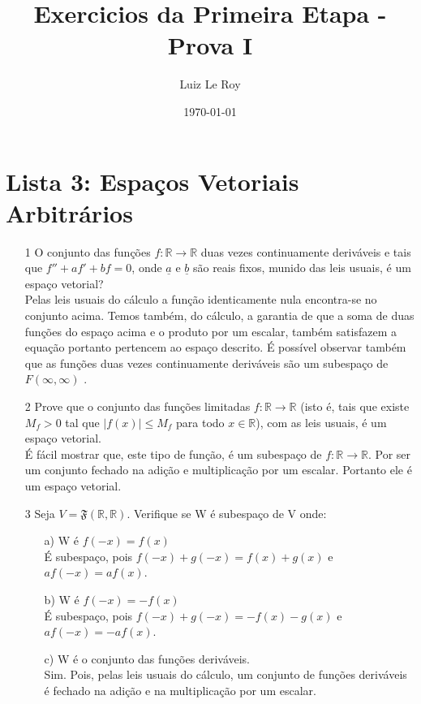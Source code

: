 \documentclass[a4paper]{article}
\title{Exercicios da Primeira Etapa - Prova I}
\date{\mydate\today}
\author{Luiz Le Roy}
\begin{document}
  \maketitle

\section*{Lista 3: Espaços Vetoriais Arbitrários}
\begin{itemize}
\item[1] O conjunto das funções $f:\mathbb{R}\longrightarrow \mathbb{R}$ duas vezes continuamente deriváveis e tais que $f''+af'+bf=0$, onde $\underline{a}$ e $\underline{b}$ são reais fixos, munido das leis usuais, é um espaço vetorial?
\\\textcolor[rgb]{0,0,1}{Pelas leis usuais do cálculo a função identicamente nula encontra-se no conjunto acima. Temos também, do cálculo, a garantia de que a soma de duas funções do espaço acima e o produto por um escalar, também satisfazem a equação portanto pertencem ao espaço descrito. É possível observar também que as funções duas vezes continuamente deriváveis são um subespaço de $F(\infty,\infty)$ .%
}
\item[2] Prove que o conjunto das funções limitadas $f:\mathbb{R}\longrightarrow \mathbb{R}$ (isto é, tais que existe $M_f>0$ tal que $|f(x)|\leq M_f$ para todo $x\in \mathbb{R}$), com as leis usuais, é um espaço vetorial.
\\\textcolor[rgb]{0,0,1}{É fácil mostrar que, este tipo de função, é um subespaço de $f:\mathbb{R}\longrightarrow \mathbb{R}$. Por ser um conjunto fechado na adição e multiplicação por um escalar. Portanto ele é um espaço vetorial.}

\item[3] Seja $V=\mathfrak{F}(\mathbb{R,R})$. Verifique se W é subespaço de V onde:
\begin{itemize}
\item [a)] W é $f(-x)=f(x)$
\\\textcolor[rgb]{0,0,1}{É subespaço, pois $f(-x)+g(-x)=f(x)+g(x)$ e $af(-x)=af(x)$.}
\item [b)] W é $f(-x)=-f(x)$
\\\textcolor[rgb]{0,0,1}{É subespaço, pois $f(-x)+g(-x)=-f(x)-g(x)$ e $af(-x)=-af(x)$.}
\item[c)] W é o conjunto das funções deriváveis.
\\\textcolor[rgb]{0,0,1}{Sim. Pois, pelas leis usuais do cálculo, um conjunto de funções deriváveis é fechado na adição e na multiplicação por um escalar.}
\end{itemize}


\end{itemize}
\end{document}

